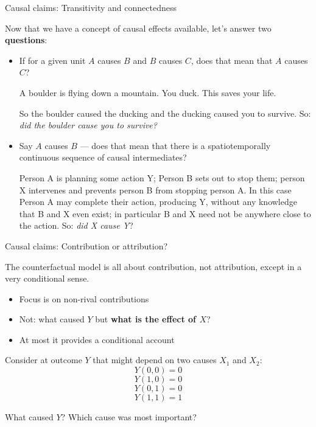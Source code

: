 \documentclass[11pt,ignorenonframetext,]{beamer}
\providecommand{\tightlist}{%
  \setlength{\itemsep}{0pt}\setlength{\parskip}{0pt}}
\begin{document}
\begin{frame}{Causal claims: Transitivity and connectedness}

Now that we have a concept of causal effects available, let's answer two
\textbf{questions}:

\begin{itemize}
        \item If for a given unit $A$ causes $B$ and $B$ causes $C$, does that mean that $A$ causes $C$? 
        
        \color{red}\small A boulder is flying down a mountain. You duck. This saves your life.  
            
            So the boulder caused the ducking and the ducking caused you to survive. So: \textit{did the boulder cause you to survive?} 
        \color{black}
        \item Say $A$ causes $B$ --- does that mean that there is a spatiotemporally continuous sequence of causal intermediates? 
        
        \color{red}\small Person A is planning some action Y; Person B sets out to stop them; person X intervenes and prevents person B from stopping person A. In this case Person A may complete their action, producing Y, without any knowledge that B and X even exist; in particular B and X need not be anywhere close to the action. So: \textit{ did X cause Y}? 
\end{itemize}

\end{frame}

\begin{frame}{Causal claims: Contribution or attribution?}

The counterfactual model is all about contribution, not attribution,
except in a very conditional sense.

\begin{itemize}
\tightlist
\item
  Focus is on non-rival contributions
\item
  Not: what caused \(Y\) but \textbf{what is the effect of \(X\)}?
\item
  At most it provides a conditional account
\end{itemize}

Consider at outcome \(Y\) that might depend on two causes \(X_1\) and
\(X_2\): \[Y(0,0) = 0\] \[Y(1,0) = 0\] \[Y(0,1) = 0\] \[Y(1,1) = 1\]

What caused \(Y\)? Which cause was most important?

\end{frame}
\end{document}
